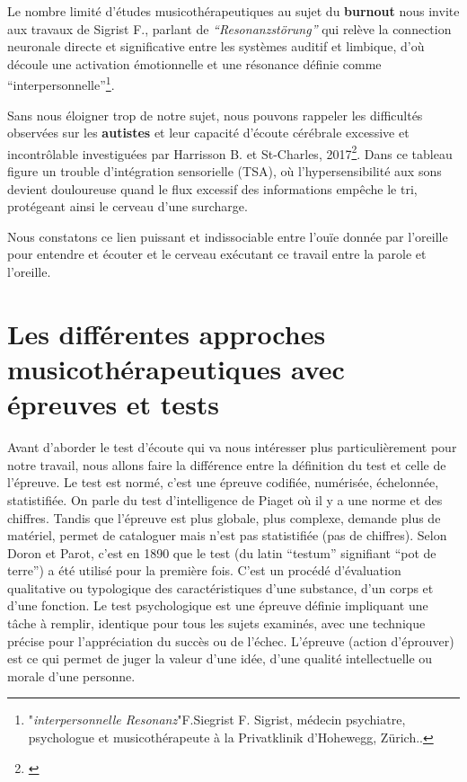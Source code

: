 Le nombre limité d'études musicothérapeutiques au sujet du \textbf{burnout}
nous invite aux travaux de Sigrist F., parlant de
\textit{``Resonanzstörung''} qui relève la connection neuronale directe et significative entre les systèmes auditif et
         limbique, d'où découle une activation émotionnelle et une
         résonance définie comme ``interpersonnelle''\footnote{"\textit{interpersonnelle Resonanz}"F.Siegrist F. Sigrist, médecin
psychiatre, psychologue et musicothérapeute à la Privatklinik
d'Hohewegg, Zürich.\autocite[pp.55--90] {sigrist_burnout_2016}.}.



Sans nous éloigner trop de notre sujet, nous pouvons rappeler
les difficultés observées sur les
\textbf{autistes} et leur capacité d'écoute cérébrale excessive et
incontrôlable investiguées par Harrisson B. et St-Charles, 2017\footnote{\autocite[Cet ouvrage propose une description unique du TSA
   (trouble du spectre de l'autisme
   pp. 22--23)]{harrisson.st-charles:lautisme} }. Dans ce tableau
 figure un trouble d'intégration sensorielle (TSA), où
 l'hypersensibilité aux sons devient douloureuse quand le flux excessif
 des
 informations empêche le tri,  protégeant ainsi le cerveau d'une surcharge.


Nous constatons ce lien puissant et indissociable  entre l'ouïe donnée
par l'oreille pour entendre et écouter et le cerveau exécutant ce
travail entre la 
parole et l'oreille.








\chapter{Les différentes approches musicothérapeutiques avec épreuves
  et tests}
Avant d'aborder le test d'écoute qui va nous intéresser plus
particulièrement pour notre travail, nous allons faire la différence
entre la définition du test et celle de l'épreuve.
Le test est normé, c'est une épreuve codifiée, numérisée, échelonnée,
statistifiée. On parle du test d'intelligence de Piaget où il y a une
norme et des chiffres. Tandis que l'épreuve est plus globale, plus complexe,
demande plus de matériel, permet de
cataloguer mais n'est pas statistifiée (pas de chiffres).
Selon Doron et Parot, c'est en 1890 que le test (du latin ``testum''
signifiant ``pot de terre'') a été utilisé pour la
première fois. C'est un procédé d'évaluation qualitative ou
typologique des caractéristiques d'une substance, d'un corps et d'une
fonction.
Le test psychologique est une épreuve définie impliquant une tâche à
remplir, identique pour tous les sujets examinés, avec une technique
précise pour l'appréciation du succès ou de l'échec.
L'épreuve (action d'éprouver) est ce qui permet de juger la valeur
d'une idée, d'une qualité intellectuelle ou morale d'une personne.

